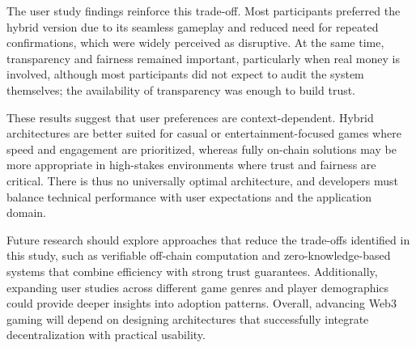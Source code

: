 \documentclass[10pt,conference]{IEEEtran}
\begin{document}
The user study findings reinforce this trade-off. Most participants preferred the hybrid version due to its seamless gameplay and reduced need for repeated confirmations, which were widely perceived as disruptive. At the same time, transparency and fairness remained important, particularly when real money is involved, although most participants did not expect to audit the system themselves; the availability of transparency was enough to build trust.

These results suggest that user preferences are context-dependent. Hybrid architectures are better suited for casual or entertainment-focused games where speed and engagement are prioritized, whereas fully on-chain solutions may be more appropriate in high-stakes environments where trust and fairness are critical. There is thus no universally optimal architecture, and developers must balance technical performance with user expectations and the application domain.

Future research should explore approaches that reduce the trade-offs identified in this study, such as verifiable off-chain computation and zero-knowledge-based systems that combine efficiency with strong trust guarantees. Additionally, expanding user studies across different game genres and player demographics could provide deeper insights into adoption patterns. Overall, advancing Web3 gaming will depend on designing architectures that successfully integrate decentralization with practical usability.
\end{document}
